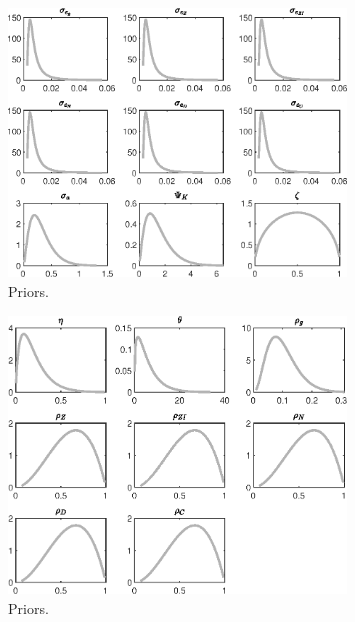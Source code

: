  
\begin{figure}[H]
\centering
\includegraphics[width=0.80\textwidth]{BRS_imp_mobility/graphs/BRS_imp_mobility_Priors1}
\caption{Priors.}\label{Fig:Priors:1}
\end{figure}
\begin{figure}[H]
\centering
\includegraphics[width=0.80\textwidth]{BRS_imp_mobility/graphs/BRS_imp_mobility_Priors2}
\caption{Priors.}\label{Fig:Priors:2}
\end{figure}
 
